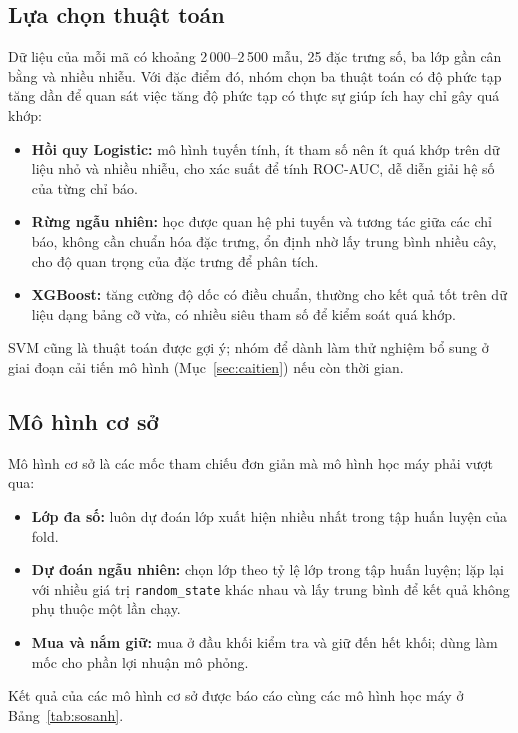 \documentclass[12pt,a4paper,oneside]{report}
\begin{document}
\subsection{Lựa chọn thuật toán}
Dữ liệu của mỗi mã có khoảng 2\,000--2\,500 mẫu, 25 đặc trưng số, ba lớp gần cân
bằng và nhiều nhiễu. Với đặc điểm đó, nhóm chọn ba thuật toán có độ phức tạp tăng
dần để quan sát việc tăng độ phức tạp có thực sự giúp ích hay chỉ gây quá khớp:
\begin{itemize}
  \item \textbf{Hồi quy Logistic:} mô hình tuyến tính, ít tham số nên ít quá khớp
        trên dữ liệu nhỏ và nhiều nhiễu, cho xác suất để tính ROC-AUC, dễ diễn
        giải hệ số của từng chỉ báo.
  \item \textbf{Rừng ngẫu nhiên:} học được quan hệ phi tuyến và tương tác giữa các
        chỉ báo, không cần chuẩn hóa đặc trưng, ổn định nhờ lấy trung bình nhiều
        cây, cho độ quan trọng của đặc trưng để phân tích.
  \item \textbf{XGBoost:} tăng cường độ dốc có điều chuẩn, thường cho kết quả tốt
        trên dữ liệu dạng bảng cỡ vừa, có nhiều siêu tham số để kiểm soát quá khớp.
\end{itemize}
SVM cũng là thuật toán được gợi ý; nhóm để dành làm thử nghiệm bổ sung ở giai đoạn
cải tiến mô hình (Mục~\ref{sec:caitien}) nếu còn thời gian.

\subsection{Mô hình cơ sở}
Mô hình cơ sở là các mốc tham chiếu đơn giản mà mô hình học máy phải vượt qua:
\begin{itemize}
  \item \textbf{Lớp đa số:} luôn dự đoán lớp xuất hiện nhiều nhất trong tập huấn
        luyện của fold.
  \item \textbf{Dự đoán ngẫu nhiên:} chọn lớp theo tỷ lệ lớp trong tập huấn luyện;
        lặp lại với nhiều giá trị \texttt{random\_state} khác nhau và lấy trung bình
        để kết quả không phụ thuộc một lần chạy.
  \item \textbf{Mua và nắm giữ:} mua ở đầu khối kiểm tra và giữ đến hết khối; dùng
        làm mốc cho phần lợi nhuận mô phỏng.
\end{itemize}
Kết quả của các mô hình cơ sở được báo cáo cùng các mô hình học máy ở
Bảng~\ref{tab:sosanh}.
\end{document}
